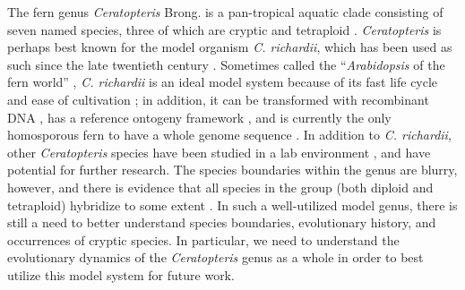 \documentclass[12pt]{article}
\begin{document}
\begin{flushleft}
The fern genus \textit{Ceratopteris} Brong. is a pan-tropical aquatic clade consisting of seven named species, three of which are cryptic and tetraploid \autocite{PPGI, LloydTax1974, Masuyama2010}. \textit{Ceratopteris} is perhaps best known for the model organism \textit{C. richardii}, which has been used as such since the late twentieth century \autocite{Banks1994, hickock1987, Hickok1995}. Sometimes called the ``\textit{Arabidopsis} of the fern world'' \autocite{Sessa2014}, \textit{C. richardii} is an ideal model system because of its fast life cycle and ease of cultivation \autocite{hickock1987}; in addition, it can be transformed with recombinant DNA \autocite{Muthukumar2013, Plackett2014}, has a reference ontogeny framework \autocite{Conway2019-cd}, and is currently the only homosporous fern to have a whole genome sequence \autocite{Marchant2019}. In addition to \textit{C. richardii}, other \textit{Ceratopteris} species have been studied in a lab environment \autocite{hickok1974, Hickok1977}, and have potential for further research. The species boundaries within the genus are blurry, however, and there is evidence that all species in the group (both diploid and tetraploid) hybridize to some extent \autocite{Adjie2007, hickok1974, Hickok1977, Hickok1979, LloydTax1974}. In such a well-utilized model genus, there is still a need to better understand species boundaries, evolutionary history, and occurrences of cryptic species. In particular, we need to understand the evolutionary dynamics of the \textit{Ceratopteris} genus as a whole in order to best utilize this model system for future work. 


\end{flushleft}
\end{document}
